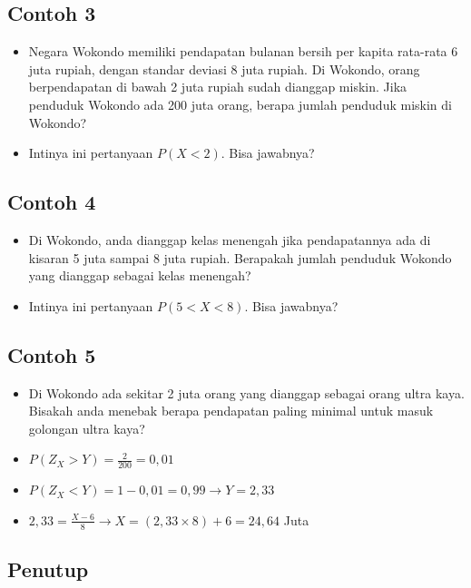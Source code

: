 \documentclass[
  letterpaper,
  DIV=11,
  numbers=noendperiod]{scrartcl}
\begin{document}
\subsection{Contoh 3}\label{contoh-3-1}

\begin{itemize}
\item
  Negara Wokondo memiliki pendapatan bulanan bersih per kapita rata-rata
  6 juta rupiah, dengan standar deviasi 8 juta rupiah. Di Wokondo, orang
  berpendapatan di bawah 2 juta rupiah sudah dianggap miskin. Jika
  penduduk Wokondo ada 200 juta orang, berapa jumlah penduduk miskin di
  Wokondo?
\item
  Intinya ini pertanyaan \(P(X<2)\). Bisa jawabnya?
\end{itemize}

\subsection{Contoh 4}\label{contoh-4-1}

\begin{itemize}
\item
  Di Wokondo, anda dianggap kelas menengah jika pendapatannya ada di
  kisaran 5 juta sampai 8 juta rupiah. Berapakah jumlah penduduk Wokondo
  yang dianggap sebagai kelas menengah?
\item
  Intinya ini pertanyaan \(P(5<X<8)\). Bisa jawabnya?
\end{itemize}

\subsection{Contoh 5}\label{contoh-5-1}

\begin{itemize}
\item
  Di Wokondo ada sekitar 2 juta orang yang dianggap sebagai orang ultra
  kaya. Bisakah anda menebak berapa pendapatan paling minimal untuk
  masuk golongan ultra kaya?
\item
  \(P(Z_X > Y) = \frac{2}{200}=0,01\)
\item
  \(P(Z_X < Y) = 1-0,01=0,99 \rightarrow Y=2,33\)
\item
  \(2,33=\frac{X-6}{8} \rightarrow X=(2,33 \times 8 ) + 6 = 24,64\) Juta
\end{itemize}

\subsection{Penutup}\label{penutup}
\end{document}
